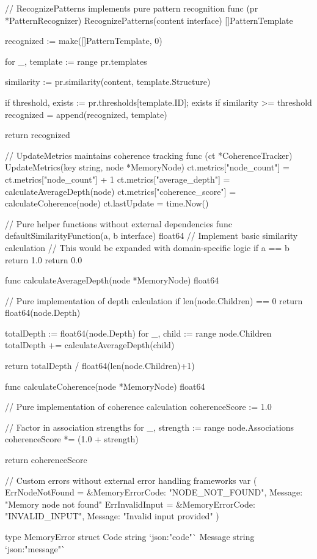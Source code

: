 // RecognizePatterns implements pure pattern recognition
func (pr *PatternRecognizer) RecognizePatterns(content interface{}) []PatternTemplate {
    recognized := make([]PatternTemplate, 0)

    for _, template := range pr.templates {
        similarity := pr.similarity(content, template.Structure)

        if threshold, exists := pr.thresholds[template.ID]; exists {
            if similarity >= threshold {
                recognized = append(recognized, template)
            }
        }
    }

    return recognized
}

// UpdateMetrics maintains coherence tracking
func (ct *CoherenceTracker) UpdateMetrics(key string, node *MemoryNode) {
    ct.metrics["node_count"] = ct.metrics["node_count"] + 1
    ct.metrics["average_depth"] = calculateAverageDepth(node)
    ct.metrics["coherence_score"] = calculateCoherence(node)
    ct.lastUpdate = time.Now()
}

// Pure helper functions without external dependencies
func defaultSimilarityFunction(a, b interface{}) float64 {
    // Implement basic similarity calculation
    // This would be expanded with domain-specific logic
    if a == b {
        return 1.0
    }
    return 0.0
}

func calculateAverageDepth(node *MemoryNode) float64 {
    // Pure implementation of depth calculation
    if len(node.Children) == 0 {
        return float64(node.Depth)
    }

    totalDepth := float64(node.Depth)
    for _, child := range node.Children {
        totalDepth += calculateAverageDepth(child)
    }

    return totalDepth / float64(len(node.Children)+1)
}

func calculateCoherence(node *MemoryNode) float64 {
    // Pure implementation of coherence calculation
    coherenceScore := 1.0

    // Factor in association strengths
    for _, strength := range node.Associations {
        coherenceScore *= (1.0 + strength)
    }

    return coherenceScore
}

// Custom errors without external error handling frameworks
var (
    ErrNodeNotFound = &MemoryError{Code: "NODE_NOT_FOUND", Message: "Memory node not found"}
    ErrInvalidInput = &MemoryError{Code: "INVALID_INPUT", Message: "Invalid input provided"}
)

type MemoryError struct {
    Code    string `json:"code"`
    Message string `json:"message"`
}

